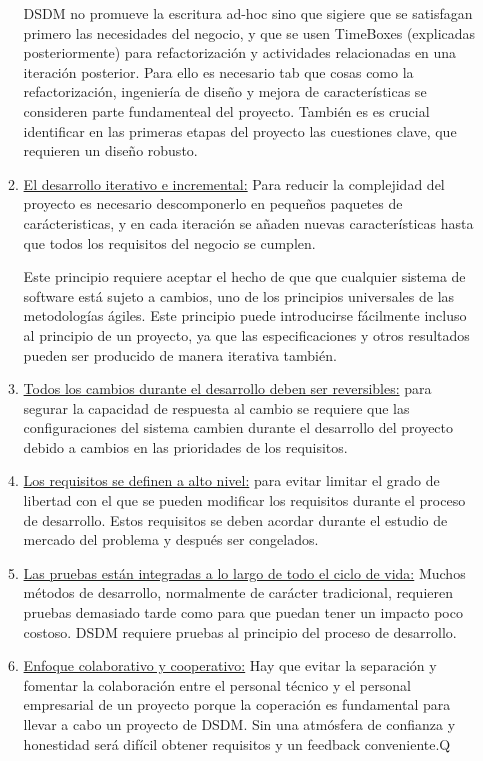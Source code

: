 \documentclass[12pt,a4paper]{article}
\begin{document}
\begin{itemize}
\begin{enumerate}
 
 DSDM no promueve la escritura ad-hoc sino que sigiere que se satisfagan  primero las necesidades del negocio, y que se usen TimeBoxes (explicadas posteriormente) para
refactorización y actividades relacionadas en una iteración posterior. Para ello es necesario tab que cosas como  la refactorización, ingeniería de diseño y mejora de características se consideren parte fundamenteal del proyecto. También es es crucial identificar en las primeras etapas del proyecto las cuestiones clave, que requieren un diseño robusto. 




\item \underline{El desarrollo iterativo e incremental:} 
Para reducir la complejidad del proyecto es necesario descomponerlo en pequeños paquetes de  carácteristicas, y en cada iteración se añaden nuevas características hasta que todos los requisitos del negocio se cumplen.

 Este principio requiere aceptar el hecho de que que cualquier sistema de software está sujeto a cambios, uno de los principios universales de las metodologías ágiles. Este principio puede introducirse fácilmente incluso al principio de un proyecto, ya que las especificaciones y otros resultados pueden ser producido de manera iterativa también. 


\item  \underline{Todos los cambios durante el desarrollo deben ser reversibles:} para segurar la capacidad de respuesta al cambio se requiere que las configuraciones del sistema cambien durante el desarrollo del proyecto debido a cambios en las prioridades de los requisitos.



\item \underline{Los requisitos se definen a alto nivel:} para evitar limitar el grado de libertad con el que se pueden modificar los requisitos durante el proceso de desarrollo.  Estos requisitos se deben acordar durante el estudio de mercado del problema y después ser congelados.

\item  \underline{Las pruebas están integradas a lo largo de todo el ciclo de vida:} Muchos métodos de desarrollo, normalmente de carácter tradicional, requieren pruebas demasiado tarde como para que puedan tener un impacto poco costoso. DSDM requiere pruebas al principio del proceso de desarrollo. 


\item \underline{Enfoque colaborativo y cooperativo:} Hay que evitar la separación y fomentar la colaboración entre el personal técnico y el personal empresarial
de un proyecto porque la coperación es fundamental para llevar a cabo un proyecto de DSDM. Sin una atmósfera de confianza y honestidad será difícil obtener requisitos y un feedback conveniente.Q
\end{enumerate}



\end{itemize}
\end{document}
